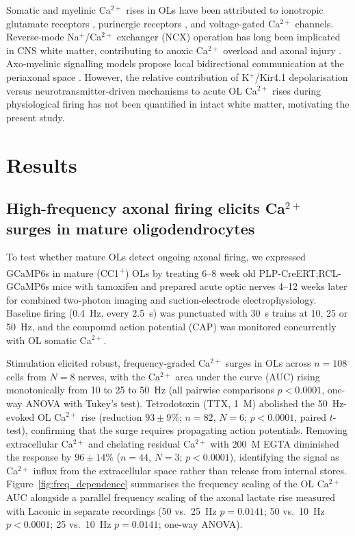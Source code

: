 \documentclass[11pt,a4paper]{article}
\begin{document}
Somatic and myelinic Ca$^{2+}$ rises in OLs have been attributed to ionotropic glutamate receptors \citep{Micu2006,Saab2016}, purinergic receptors \citep{Kettenmann2013}, and voltage-gated Ca$^{2+}$ channels. Reverse-mode Na$^+$/Ca$^{2+}$ exchanger (NCX) operation has long been implicated in CNS white matter, contributing to anoxic Ca$^{2+}$ overload and axonal injury \citep{Stys1992,Micu2018}. Axo-myelinic signalling models propose local bidirectional communication at the periaxonal space \citep{Micu2018}. However, the relative contribution of K$^+$/Kir4.1 depolarisation versus neurotransmitter-driven mechanisms to acute OL Ca$^{2+}$ rises during physiological firing has not been quantified in intact white matter, motivating the present study.

\section{Results}

\subsection{High-frequency axonal firing elicits Ca$^{2+}$ surges in mature oligodendrocytes}

To test whether mature OLs detect ongoing axonal firing, we expressed GCaMP6s in mature (CC1\textsuperscript{+}) OLs by treating 6--8 week old PLP-CreERT;RCL-GCaMP6s mice with tamoxifen and prepared acute optic nerves 4--12 weeks later for combined two-photon imaging and suction-electrode electrophysiology. Baseline firing (0.4~Hz, every 2.5~s) was punctuated with 30~s trains at 10, 25 or 50~Hz, and the compound action potential (CAP) was monitored concurrently with OL somatic Ca$^{2+}$.

Stimulation elicited robust, frequency-graded Ca$^{2+}$ surges in OLs across $n=108$ cells from $N=8$ nerves, with the Ca$^{2+}$ area under the curve (AUC) rising monotonically from 10 to 25 to 50~Hz (all pairwise comparisons $p<0.0001$, one-way ANOVA with Tukey's test). Tetrodotoxin (TTX, 1~\textmu M) abolished the 50~Hz-evoked OL Ca$^{2+}$ rise (reduction $93 \pm 9\%$; $n=82$, $N=6$; $p<0.0001$, paired $t$-test), confirming that the surge requires propagating action potentials. Removing extracellular Ca$^{2+}$ and chelating residual Ca$^{2+}$ with 200~\textmu M EGTA diminished the response by $96 \pm 14\%$ ($n=44$, $N=3$; $p<0.0001$), identifying the signal as Ca$^{2+}$ influx from the extracellular space rather than release from internal stores. Figure~\ref{fig:freq_dependence} summarises the frequency scaling of the OL Ca$^{2+}$ AUC alongside a parallel frequency scaling of the axonal lactate rise measured with Laconic in separate recordings (50 vs.\ 25~Hz $p=0.0141$; 50 vs.\ 10~Hz $p<0.0001$; 25 vs.\ 10~Hz $p=0.0141$; one-way ANOVA).
\end{document}
